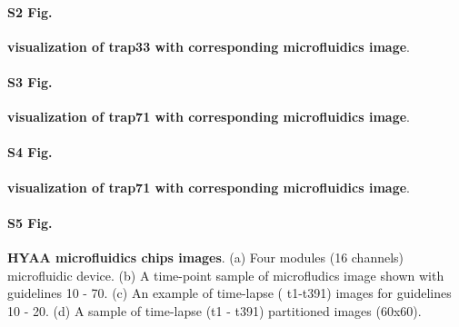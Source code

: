 \documentclass[conference]{IEEEtran}
\begin{document}


\paragraph*{S2 Fig.}
\label{S2_Fig}
{\bf  visualization of trap33 with corresponding microfluidics image}. 



\paragraph*{S3 Fig.}
\label{S3_Fig}
{\bf  visualization of trap71 with corresponding microfluidics image}. 



\paragraph*{S4 Fig.}
\label{S4_Fig}
{\bf visualization of trap71 with corresponding microfluidics image}. 




\paragraph*{S5 Fig.}
\label{S5_Fig}
{\bf HYAA microfluidics chips images}. (a) Four modules (16 channels) microfluidic device. (b) A time-point sample of microfludics image shown with guidelines 10 - 70. (c) An example of time-lapse ( t1-t391) images for guidelines 10 - 20. (d) A sample of time-lapse (t1 - t391) partitioned images (60x60). 
\end{document}
